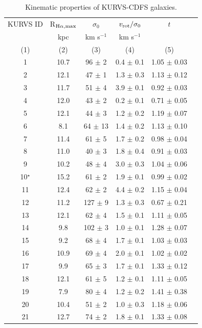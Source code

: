 \begin{table}
\centering
\caption{Kinematic properties of KURVS-CDFS galaxies.}
\label{tab2:kinematics}
\begin{tabular}{cccccc} 
\hline
\hline
KURVS ID & R$_{\rm H\alpha, max}$  & $\sigma_0$ & $v_{\rm rot}/\sigma_0$ & $t$  \\
 & kpc & km s$^{-1}$  & km s$^{-1}$ &  &  \\
  (1) & (2) & (3) & (4)  & (5) \\
\hline
1 & 10.7 & 96 $\pm$ 2 & 0.4 $\pm$ 0.1 & 1.05 $\pm$ 0.03 & \\
2 & 12.1 & 47 $\pm$ 1 & 1.3 $\pm$ 0.3 & 1.13 $\pm$ 0.12 & \\
3 & 11.7 & 51 $\pm$ 4 & 3.9 $\pm$ 0.1 & 0.92 $\pm$ 0.03 & \\
4 & 12.0 & 43 $\pm$ 2 & 0.2 $\pm$ 0.1 & 0.71 $\pm$ 0.05 & \\
5 & 12.1 & 44 $\pm$ 3 & 1.2 $\pm$ 0.2 & 1.19 $\pm$ 0.07 & \\
6 & 8.1 & 64 $\pm$ 13 & 1.4 $\pm$ 0.2 & 1.13 $\pm$ 0.10 & \\
7 & 11.4 & 61 $\pm$ 5 & 1.7 $\pm$ 0.2 & 0.98 $\pm$ 0.04 & \\
8 & 11.0 & 40 $\pm$ 3 & 1.8 $\pm$ 0.4 & 0.91 $\pm$ 0.03 & \\
9 & 10.2 & 48 $\pm$ 4 & 3.0 $\pm$ 0.3 & 1.04 $\pm$ 0.06 & \\
10$^{\star}$ & 15.2 & 61 $\pm$ 2 & 1.9 $\pm$ 0.1 & 0.99 $\pm$ 0.02 & \\
11 & 12.4 & 62 $\pm$ 2 & 4.4 $\pm$ 0.2 & 1.15 $\pm$ 0.04 & \\
12 & 11.2 & 127 $\pm$ 9 & 1.3 $\pm$ 0.3 & 0.67 $\pm$ 0.21 & \\
13 & 12.1 & 62 $\pm$ 4 & 1.5 $\pm$ 0.1 & 1.11 $\pm$ 0.05 & \\
14 & 9.8 & 102 $\pm$ 3 & 1.0 $\pm$ 0.1 & 1.28 $\pm$ 0.07 & \\
15 & 9.2 & 68 $\pm$ 4 & 1.7 $\pm$ 0.1 & 1.03 $\pm$ 0.03 & \\
16 & 10.9 & 69 $\pm$ 4 & 2.0 $\pm$ 0.1 & 1.02 $\pm$ 0.02 & \\
17 & 9.9 & 65 $\pm$ 3 & 1.7 $\pm$ 0.1 & 1.33 $\pm$ 0.12 & \\
18 & 12.1 & 61 $\pm$ 5 & 1.2 $\pm$ 0.1 & 1.11 $\pm$ 0.05 & \\
19 & 7.9 & 80 $\pm$ 4 & 1.2 $\pm$ 0.2 & 1.41 $\pm$ 0.38 & \\
20 & 10.4 & 51 $\pm$ 2 & 1.0 $\pm$ 0.3 & 1.18 $\pm$ 0.06 & \\
21 & 12.7 & 74 $\pm$ 2 & 1.8 $\pm$ 0.1 & 1.33 $\pm$ 0.08 & \\

\end{tabular}
\end{table}
